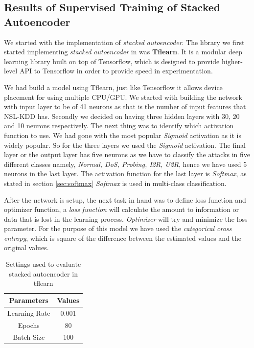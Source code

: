 \documentclass[12pt, a4paper]{report}
\begin{document}
\begin{appendices}
  \chapter{Results of Supervised Training of Stacked Autoencoder}\label{app:super}
 We started with the implementation of \textit{stacked autoencoder}. The library we first started implementing \textit{stacked autoencoder} in was \textbf{Tflearn}. It is a modular deep learning library built on top of Tensorflow, which is designed to provide higher-level API to Tensorflow in order to provide speed in experimentation.\\ \par

We had build a model using Tflearn, just like Tensorflow it allows device placement for using multiple CPU/GPU. We started with building the network with input layer to be of 41 neurons as that is the number of input features that NSL-KDD has. Secondly we decided on having three hidden layers with 30, 20 and 10 neurons respectively. The next thing was to identify which activation function to use. We had gone with the most popular \textit{Sigmoid} activation as it is widely popular. So for the three layers we used the \textit{Sigmoid} activation. The final layer or the output layer has five neurons as we have to classify the attacks in five different classes namely, \textit{Normal, DoS, Probing, I2R, U2R}, hence we have used 5 neurons in the last layer. The activation function for the last layer is \textit{Softmax}, as stated in section \ref{sec:softmax} \textit{Softmax} is used in multi-class classification.\\ \par

After the network is setup, the next task in hand was to define loss function and optimizer function, a \textit{loss function} will calculate the amount to information or data that is lost in the learning process. \textit{Optimizer} will try and minimize the loss parameter. For the purpose of this model we have used the \textit{categorical cross entropy}, which is square of the difference between the estimated values and the original values. \\ \par
\begin{table}[ht]
\centering
\captionsetup{justification=centering,margin=2cm}
\begin{tabular}{|c|c|}
\hline
\textbf{Parameters} & \textbf{Values} \\ \hline
Learning Rate       & 0.001           \\ \hline
Epochs              & 80              \\ \hline
Batch Size          & 100             \\ \hline
\end{tabular}
\caption{Settings used to evaluate stacked autoencoder in tflearn}
\label{setting_tflearn_autoencoder}
\end{table}
\clearpage

\end{appendices}
\end{document}
